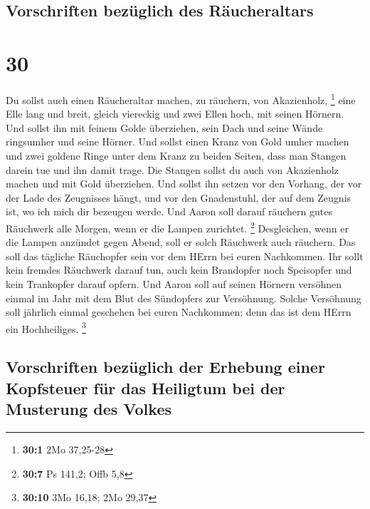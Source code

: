 \hypertarget{vorschriften-bezuxfcglich-des-ruxe4ucheraltars}{%
\subsection{Vorschriften bezüglich des
Räucheraltars}\label{vorschriften-bezuxfcglich-des-ruxe4ucheraltars}}

\hypertarget{section-29}{%
\section{30}\label{section-29}}

 Du sollst auch einen Räucheraltar machen, zu räuchern,
von Akazienholz, \footnote{\textbf{30:1} 2Mo 37,25-28} 
eine Elle lang und breit, gleich viereckig und zwei Ellen hoch, mit
seinen Hörnern.  Und sollst ihn mit feinem Golde
überziehen, sein Dach und seine Wände ringsumher und seine Hörner. Und
sollst einen Kranz von Gold umher machen  und zwei goldene
Ringe unter dem Kranz zu beiden Seiten, dass man Stangen darein tue und
ihn damit trage.  Die Stangen sollst du auch von
Akazienholz machen und mit Gold überziehen.  Und sollst
ihn setzen vor den Vorhang, der vor der Lade des Zeugnisses hängt, und
vor den Gnadenstuhl, der auf dem Zeugnis ist, wo ich mich dir bezeugen
werde.  Und Aaron soll darauf räuchern gutes Räuchwerk
alle Morgen, wenn er die Lampen zurichtet. \footnote{\textbf{30:7} Ps
  141,2; Offb 5,8}  Desgleichen, wenn er die Lampen
anzündet gegen Abend, soll er solch Räuchwerk auch räuchern. Das soll
das tägliche Räuchopfer sein vor dem HErrn bei euren Nachkommen.
 Ihr sollt kein fremdes Räuchwerk darauf tun, auch kein
Brandopfer noch Speisopfer und kein Trankopfer darauf opfern.
 Und Aaron soll auf seinen Hörnern versöhnen einmal im
Jahr mit dem Blut des Sündopfers zur Versöhnung. Solche Versöhnung soll
jährlich einmal geschehen bei euren Nachkommen; denn das ist dem HErrn
ein Hochheiliges. \footnote{\textbf{30:10} 3Mo 16,18; 2Mo 29,37}

\hypertarget{vorschriften-bezuxfcglich-der-erhebung-einer-kopfsteuer-fuxfcr-das-heiligtum-bei-der-musterung-des-volkes}{%
\subsection{Vorschriften bezüglich der Erhebung einer Kopfsteuer für das
Heiligtum bei der Musterung des
Volkes}\label{vorschriften-bezuxfcglich-der-erhebung-einer-kopfsteuer-fuxfcr-das-heiligtum-bei-der-musterung-des-volkes}}

